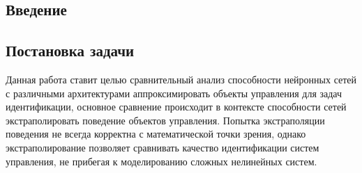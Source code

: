 \documentclass[12pt, oneside]{extbook}
\begin{document}
\begin{flushleft} \setlength{\parindent}{1cm}
\chapter{Введение}
\section{Постановка задачи}
Данная работа ставит целью сравнительный анализ способности нейронных сетей с различными архитектурами аппроксимировать объекты управления для задач идентификации, основное сравнение происходит в контексте способности сетей экстраполировать поведение объектов управления. Попытка экстраполяции поведения не всегда корректна с математической точки зрения, однако экстраполирование позволяет сравнивать качество идентификации систем управления, не прибегая к моделированию сложных нелинейных систем.

\end{flushleft}
\end{document}
